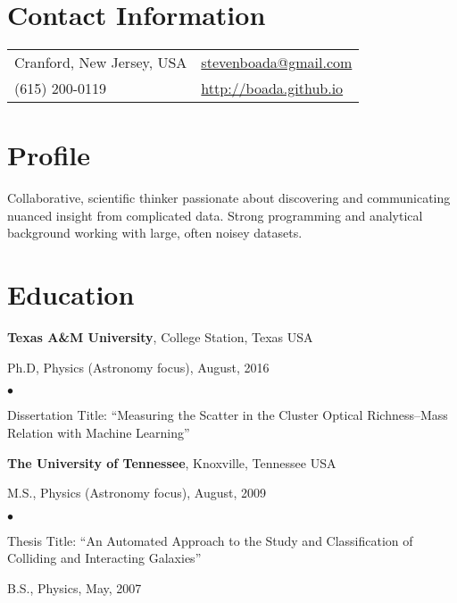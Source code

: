 \documentclass[margin,line, 11pt]{res}
\newenvironment{list1}{
  \begin{list}{\ding{113}}{%
      \setlength{\itemsep}{0in}
      \setlength{\parsep}{0in} \setlength{\parskip}{0in}
      \setlength{\topsep}{0in} \setlength{\partopsep}{0in}
      \setlength{\leftmargin}{0.17in}}}{\end{list}}
\newenvironment{list2}{
  \begin{list}{$\bullet$}{%
      \setlength{\itemsep}{0in}
      \setlength{\parsep}{0in} \setlength{\parskip}{0in}
      \setlength{\topsep}{0in} \setlength{\partopsep}{0in}
      \setlength{\leftmargin}{0.2in}}}{\end{list}}
\begin{document}

\begin{resume}
\section{Contact Information}
\begin{tabular}{@{}p{3in}p{3in}}
Cranford, New Jersey, USA & \href{mailto:stevenboada@gmail.com}{stevenboada@gmail.com} \\
(615) 200-0119   & \url{http://boada.github.io} \\
\end{tabular}
\vspace*{-6mm}

\section{Profile}
Collaborative, scientific thinker passionate about discovering and communicating nuanced insight from complicated data. Strong programming and analytical background working with large, often noisey datasets.
\vspace*{-5mm}

\section{Education}
\textbf{Texas A\&M University}, College Station, Texas USA\\
\vspace*{-5mm}
\begin{list1}
	\item[]Ph.D, Physics (Astronomy focus), August, 2016
	\begin{list2}
		\item Dissertation Title: ``Measuring the Scatter in the Cluster Optical Richness--Mass Relation with Machine Learning''
	\end{list2}
\end{list1}
\vspace*{-5mm}

\textbf{The University of Tennessee}, Knoxville, Tennessee USA\\
\vspace*{-5mm}
\begin{list1}
	\item[] M.S., Physics (Astronomy focus),  August, 2009
	\begin{list2}
		\item Thesis Title: ``An Automated Approach to the Study and Classification of Colliding and Interacting Galaxies''
	\end{list2}
	\item[] B.S., Physics,  May, 2007
\end{list1}
\vspace*{-5mm}


\end{resume}
\end{document}
